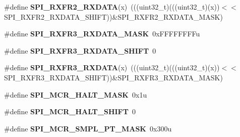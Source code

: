 \begin{DoxyCompactItemize}
\item 
\#define {\bfseries S\+P\+I\+\_\+\+R\+X\+F\+R2\+\_\+\+R\+X\+D\+A\+TA}(x)~(((uint32\+\_\+t)(((uint32\+\_\+t)(x))$<$$<$S\+P\+I\+\_\+\+R\+X\+F\+R2\+\_\+\+R\+X\+D\+A\+T\+A\+\_\+\+S\+H\+I\+FT))\&S\+P\+I\+\_\+\+R\+X\+F\+R2\+\_\+\+R\+X\+D\+A\+T\+A\+\_\+\+M\+A\+SK)\hypertarget{group__SPI__Register__Masks_ga88f81c7a0134abe2eb9dac410625fee3}{}\label{group__SPI__Register__Masks_ga88f81c7a0134abe2eb9dac410625fee3}

\item 
\#define {\bfseries S\+P\+I\+\_\+\+R\+X\+F\+R3\+\_\+\+R\+X\+D\+A\+T\+A\+\_\+\+M\+A\+SK}~0x\+F\+F\+F\+F\+F\+F\+F\+Fu\hypertarget{group__SPI__Register__Masks_ga06579b6d579b820152dd81435d71c09e}{}\label{group__SPI__Register__Masks_ga06579b6d579b820152dd81435d71c09e}

\item 
\#define {\bfseries S\+P\+I\+\_\+\+R\+X\+F\+R3\+\_\+\+R\+X\+D\+A\+T\+A\+\_\+\+S\+H\+I\+FT}~0\hypertarget{group__SPI__Register__Masks_gaae4c2a3c38669f7a03fbcaabd29de0c7}{}\label{group__SPI__Register__Masks_gaae4c2a3c38669f7a03fbcaabd29de0c7}

\item 
\#define {\bfseries S\+P\+I\+\_\+\+R\+X\+F\+R3\+\_\+\+R\+X\+D\+A\+TA}(x)~(((uint32\+\_\+t)(((uint32\+\_\+t)(x))$<$$<$S\+P\+I\+\_\+\+R\+X\+F\+R3\+\_\+\+R\+X\+D\+A\+T\+A\+\_\+\+S\+H\+I\+FT))\&S\+P\+I\+\_\+\+R\+X\+F\+R3\+\_\+\+R\+X\+D\+A\+T\+A\+\_\+\+M\+A\+SK)\hypertarget{group__SPI__Register__Masks_gaa0268e30e0adb838413ec371a2afecf7}{}\label{group__SPI__Register__Masks_gaa0268e30e0adb838413ec371a2afecf7}

\item 
\#define {\bfseries S\+P\+I\+\_\+\+M\+C\+R\+\_\+\+H\+A\+L\+T\+\_\+\+M\+A\+SK}~0x1u\hypertarget{group__SPI__Register__Masks_ga88c670302548b2d5b5f032b5709bc366}{}\label{group__SPI__Register__Masks_ga88c670302548b2d5b5f032b5709bc366}

\item 
\#define {\bfseries S\+P\+I\+\_\+\+M\+C\+R\+\_\+\+H\+A\+L\+T\+\_\+\+S\+H\+I\+FT}~0\hypertarget{group__SPI__Register__Masks_ga8f13f49cf8502462271d8a179338d81b}{}\label{group__SPI__Register__Masks_ga8f13f49cf8502462271d8a179338d81b}

\item 
\#define {\bfseries S\+P\+I\+\_\+\+M\+C\+R\+\_\+\+S\+M\+P\+L\+\_\+\+P\+T\+\_\+\+M\+A\+SK}~0x300u\hypertarget{group__SPI__Register__Masks_gaebb0539e04af465a39892f5aaabc872d}{}\label{group__SPI__Register__Masks_gaebb0539e04af465a39892f5aaabc872d}


\end{DoxyCompactItemize}
